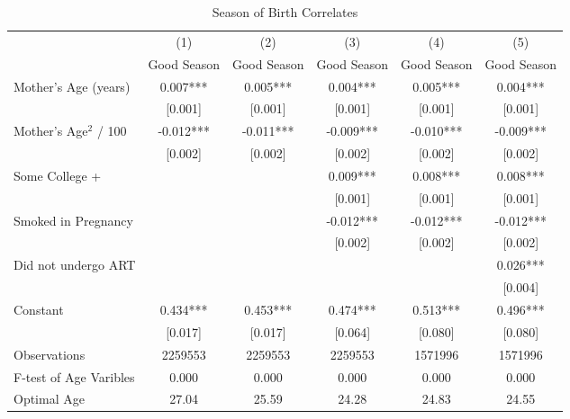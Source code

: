 \documentclass[a4paper, 11.5 pt]{article}
\theoremstyle{plain}
\begin{document}
\begin{doublespace}
\begin{table}[htbp]\centering
\def\sym#1{\ifmmode^{#1}\else\(^{#1}\)\fi}
\caption{Season of Birth Correlates  \label{tab:bqMain}}
\begin{tabular}{l*{5}{c}}
\toprule
                    &\multicolumn{1}{c}{(1)}   &\multicolumn{1}{c}{(2)}   &\multicolumn{1}{c}{(3)}   &\multicolumn{1}{c}{(4)}   &\multicolumn{1}{c}{(5)}   \\
                    & Good Season   & Good Season   & Good Season   & Good Season   & Good Season   \\
\midrule
Mother's Age (years)&       0.007***&       0.005***&       0.004***&       0.005***&       0.004***\\
                    &     [0.001]   &     [0.001]   &     [0.001]   &     [0.001]   &     [0.001]   \\
Mother's Age$^2$ / 100&      -0.012***&      -0.011***&      -0.009***&      -0.010***&      -0.009***\\
                    &     [0.002]   &     [0.002]   &     [0.002]   &     [0.002]   &     [0.002]   \\
Some College +      &               &               &       0.009***&       0.008***&       0.008***\\
                    &               &               &     [0.001]   &     [0.001]   &     [0.001]   \\
Smoked in Pregnancy &               &               &      -0.012***&      -0.012***&      -0.012***\\
                    &               &               &     [0.002]   &     [0.002]   &     [0.002]   \\
Did not undergo ART &               &               &               &               &       0.026***\\
                    &               &               &               &               &     [0.004]   \\
Constant            &       0.434***&       0.453***&       0.474***&       0.513***&       0.496***\\
                    &     [0.017]   &     [0.017]   &     [0.064]   &     [0.080]   &     [0.080]   \\
\midrule
Observations        &     2259553   &     2259553   &     2259553   &     1571996   &     1571996   \\
F-test of Age Varibles&0.000&0.000&0.000&0.000&0.000 \\
Optimal Age &27.04&25.59&24.28&24.83&24.55 \\

\end{tabular}
\end{table}
\end{doublespace}
\end{document}

